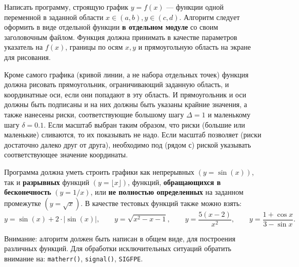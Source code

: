 
Написать программу, строящую график $y=f(x)$ --- функции одной переменной в заданной
области $x\in(a,b), y\in(c,d)$. Алгоритм следует оформить в виде отдельной
функции \textbf{в отдельном модуле} со своим заголовочным файлом.
Функция должна принимать в качестве параметров указатель на $f(x)$, границы по осям $x, y$
и прямоугольную область на экране для рисования.

Кроме самого графика (кривой линии, а не набора отдельных точек) функция должна 
рисовать прямоугольник, ограничивающий заданную область, и координатные оси, 
если они попадают в эту область.
И прямоугольник и оси должны быть подписаны и на них должны быть указаны крайние 
значения, а также нанесены риски, соответствующие большому 
шагу $\Delta = 1$ и маленькому шагу $\delta = 0.1$. Если масштаб выбран таким образом,
что риски (большие или маленькие) сливаются, то их показывать не надо. Если масштаб 
позволяет (риски достаточно далеко друг от друга), необходимо под (рядом с) риской 
указывать соответствующее значение координаты.

Программа должна уметь строить графики как непрерывных $(y=\sin(x))$, 
так и \textbf{разрывных} функций $(y=\lfloor x \rfloor)$,
функций, \textbf{обращающихся в бесконечность} $(y=1/x)$,
или \textbf{не полностью определенных} на заданном промежутке $(y=\sqrt x)$.
В качестве тестовых функций также можно взять:
%
\[
y = \sin(x)+2\cdot|\sin(x)|, \qquad
y = \sqrt{x^2-x-1}, \qquad
y = \frac{5(x-2)}{x^2}, \qquad
y = \frac{1+\cos x}{3-\sin x}.
\]

Внимание: алгоритм должен быть написан в общем виде, для построения различных 
функций. Для обработки исключительных ситуаций обратить внимание на: 
\texttt{matherr()}, \texttt{signal()}, \texttt{SIGFPE}.
